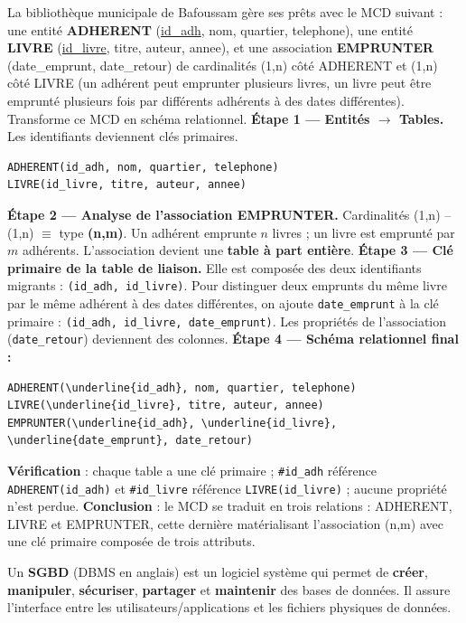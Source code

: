 \documentclass[11pt]{article}
\newcounter{popsec}
\newcounter{popsub}
\newcommand{\courssub}[1]{%
  \stepcounter{popsub}%
  \par\vspace{9pt}\noindent{\popxbold\fontsize{11.5}{13}\selectfont\color{popink}{\color{poporange}\thepopsec.\thepopsub}\hspace{6pt}#1}\par\nopagebreak\vspace{4pt}
}
\begin{document}
\begin{exoresolu}
La bibliothèque municipale de Bafoussam gère ses prêts avec le MCD suivant : une entité \textbf{ADHERENT} (\underline{id\_adh}, nom, quartier, telephone), une entité \textbf{LIVRE} (\underline{id\_livre}, titre, auteur, annee), et une association \textbf{EMPRUNTER} (date\_emprunt, date\_retour) de cardinalités (1,n) côté ADHERENT et (1,n) côté LIVRE (un adhérent peut emprunter plusieurs livres, un livre peut être emprunté plusieurs fois par différents adhérents à des dates différentes). Transforme ce MCD en schéma relationnel.
\tcblower
\textbf{Étape 1 — Entités $\to$ Tables.} Les identifiants deviennent clés primaires.
\begin{lstlisting}
ADHERENT(id_adh, nom, quartier, telephone)
LIVRE(id_livre, titre, auteur, annee)
\end{lstlisting}
\textbf{Étape 2 — Analyse de l'association EMPRUNTER.} Cardinalités (1,n) -- (1,n) $\equiv$ type \textbf{(n,m)}. Un adhérent emprunte $n$ livres ; un livre est emprunté par $m$ adhérents. L'association devient une \textbf{table à part entière}.
\textbf{Étape 3 — Clé primaire de la table de liaison.} Elle est composée des deux identifiants migrants : \texttt{(id\_adh, id\_livre)}. Pour distinguer deux emprunts du même livre par le même adhérent à des dates différentes, on ajoute \texttt{date\_emprunt} à la clé primaire : \texttt{(id\_adh, id\_livre, date\_emprunt)}. Les propriétés de l'association (\texttt{date\_retour}) deviennent des colonnes.
\textbf{Étape 4 — Schéma relationnel final :}
\begin{lstlisting}
ADHERENT(\underline{id_adh}, nom, quartier, telephone)
LIVRE(\underline{id_livre}, titre, auteur, annee)
EMPRUNTER(\underline{id_adh}, \underline{id_livre}, \underline{date_emprunt}, date_retour)
\end{lstlisting}
\textbf{Vérification} : chaque table a une clé primaire ; \texttt{\#id\_adh} référence \texttt{ADHERENT(id\_adh)} et \texttt{\#id\_livre} référence \texttt{LIVRE(id\_livre)} ; aucune propriété n'est perdue.
\textbf{Conclusion} : le MCD se traduit en trois relations : ADHERENT, LIVRE et EMPRUNTER, cette dernière matérialisant l'association (n,m) avec une clé primaire composée de trois attributs.
\end{exoresolu}

\courssub{SGBD : rôle, caractéristiques et exemples}

\begin{definition}
Un \textbf{SGBD} (DBMS en anglais) est un logiciel système qui permet de \textbf{créer}, \textbf{manipuler}, \textbf{sécuriser}, \textbf{partager} et \textbf{maintenir} des bases de données. Il assure l'interface entre les utilisateurs/applications et les fichiers physiques de données.
\end{definition}
\end{document}
